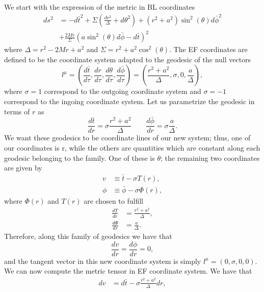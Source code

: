 \begin{Proof}
We start with the expression of the metric in \gls{BL} coordinates
\begin{align}\label{eq:Kerrmetricblsimpl}
 ds^2&=-d\bar{t}^2+ \Sigma \left(\frac{dr^2}{\Delta}+d\theta^2 \right)+(r^2+a^2)\sin^2{(\theta)} d\bar{\phi}^2\\
 &+\frac{2 M r}{\Sigma}(a \sin^2{(\theta)} d \bar{\phi} -d\bar{t})^2
\end{align}
where $\Delta=r^2-2 M r+a^2$ and $\Sigma=r^2+a^2 \cos^2{(\theta)}$. The \gls{EF} coordinates are defined to be the coordinate system adapted to the geodesic of the null vectors
\begin{equation}
 l^\mu=\left( \frac{d\bar{t}}{d\tau},\frac{dr}{d\tau},\frac{d\theta}{d\tau},\frac{d\bar{\phi}}{d\tau} \right)=\left( \frac{r^2+a^2}{\Delta},\sigma,0,\frac{a}{\Delta} \right),
\end{equation}
where $\sigma=1$ correspond to the outgoing coordinate system and $\sigma=-1$ correspond to the ingoing coordinate system. Let us parametrize the geodesic in terms of $r$ as
\begin{equation}
 \frac{d\bar{t}}{dr}=\sigma \frac{r^2+a^2}{\Delta} \quad \quad  \frac{d\bar{\phi}}{dr}=\sigma \frac{a}{\Delta}.
\end{equation}
We want these geodesics to be coordinate lines of our new system; thus, one of our coordinates is r, while the others are quantities which are constant along each geodesic belonging to the
family. One of these is $\theta$; the remaining two coordinates are given by
\begin{align}
 v &\equiv \bar{t} - \sigma T(r),\\
\phi &\equiv \bar{\phi} - \sigma \Phi(r),
\end{align}
where $\Phi(r)$ and $T(r)$ are chosen to fulfill
\begin{align}
 \frac{dT}{dr}&=\frac{r^2+a^2}{\Delta},\\
 \frac{d\Phi}{dr}&=\frac{a}{\Delta}.
\end{align}
Therefore, along this family of geodesics we have that
\begin{equation}
 \frac{dv}{dr}=\frac{d\phi}{dr}=0,
\end{equation}
and the tangent vector in this new coordinate system is simply $l^\mu=\left( 0,\sigma,0,0 \right)$. We can now compute the metric tensor in \gls{EF} coordinate system. We have that
\begin{align}
 dv&=d\bar{t}- \sigma \frac{r^2+a^2}{\Delta} dr, \label{eq:Kerrcoordtrans1} \\

\end{align}
\end{Proof}
